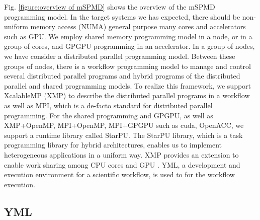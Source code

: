 \documentclass[graybox]{svmult}
\begin{document}
Fig. \ref{figure:overview of mSPMD} shows the overview of the mSPMD programming model. 
In the target systems we has expected, there should be non-uniform memory access (NUMA) general purpose many cores and accelerators such as GPU. 
We  employ shared memory programming model in a node, or in a group of cores, and GPGPU programming in an accelerator. In a group of nodes, we have consider a distributed parallel programming model. Between these groups of nodes, there is a workflow programming model to manage and control several distributed parallel programs and hybrid programs of the distributed parallel and shared programming models.
To realize this framework, we support XcalableMP (XMP) to describe the distributed parallel programs in a workflow as well as MPI, which is a de-facto standard for distributed parallel programming.
For the shared programming and GPGPU, as well as XMP+OpenMP, MPI+OpenMP, MPI+GPGPU such as cuda, OpenACC, we support a runtime library called StarPU. The StarPU library\cite{Augonnet2011starpu}, which is a task programming library for hybrid architectures, enables us to implement heterogeneous applications in a uniform way. 
XMP provides an extension to enable work sharing among CPU cores and GPU \cite{odajima2013Adaptive}.
YML\cite{delannoy2004a, delannoy2006a, delannoy2006b}, a development and execution environment for a scientific workflow, is used to for the workflow execution. 

\subsection{YML}
\end{document}
